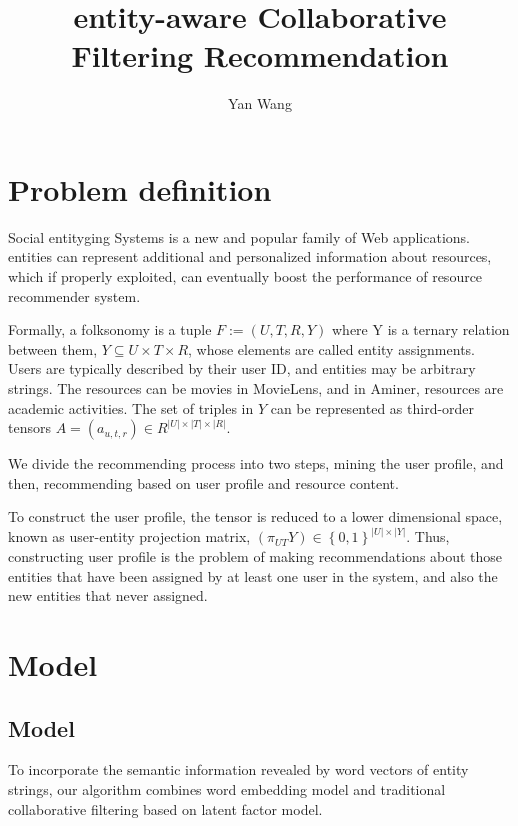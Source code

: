 \documentclass{template}
\begin{document}
\title{entity-aware Collaborative Filtering Recommendation}

\date{}

\author{Yan Wang}
\maketitle

\section{Problem definition}
Social entityging Systems is a new and popular family of Web applications. entities can represent additional and personalized information about resources, which if properly exploited, can eventually boost the performance of resource recommender system.

Formally, a folksonomy is a tuple $F := (U,T,R,Y)$ where
Y is a ternary relation between them, $Y \subseteq U\times T\times R$, whose elements are called entity assignments. Users are typically described by their user ID, and entities may be arbitrary strings. The resources can be movies in MovieLens, and in Aminer, resources are academic activities. The set of triples in $Y$ can be represented as third-order tensors $A = (a_{u,t,r}) \in R^{|U|\times |T|\times |R|}$.

We divide the recommending process into two steps, mining the user profile, and then, recommending based on user profile and resource content.

To construct the user profile, the tensor is reduced to a lower dimensional space, known as user-entity projection matrix, $(\pi_{UT}Y) \in \left\{ 0, 1 \right\}^{|U|\times |Y|}$. Thus, constructing user profile is the problem of making recommendations about those entities that have been assigned by at least one user in the system, and also the new entities that never assigned.

\section{Model}
\subsection{Model}
To incorporate the semantic information revealed by word vectors of entity strings, our algorithm combines word embedding model and traditional collaborative filtering based on latent factor model.
\end{document}
